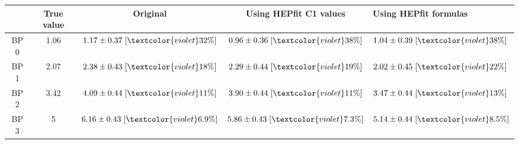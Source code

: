 \begin{tabular}{c||c|c|c}
 & True value & Original & Using HEPfit C1 values & Using HEPfit formulas\\
\hline\hline
BP 0 & 1.06 & $1.17\pm0.37\;[\textcolor{violet}{32\%}]$ & $0.96\pm0.36\;[\textcolor{violet}{38\%}]$ & $1.04\pm0.39\;[\textcolor{violet}{38\%}]$\\\hline
BP 1 & 2.07 & $2.38\pm0.43\;[\textcolor{violet}{18\%}]$ & $2.29\pm0.44\;[\textcolor{violet}{19\%}]$ & $2.02\pm0.45\;[\textcolor{violet}{22\%}]$\\\hline
BP 2 & 3.42 & $4.09\pm0.44\;[\textcolor{violet}{11\%}]$ & $3.90\pm0.44\;[\textcolor{violet}{11\%}]$ & $3.47\pm0.44\;[\textcolor{violet}{13\%}]$\\\hline
BP 3 & 5 & $6.16\pm0.43\;[\textcolor{violet}{6.9\%}]$ & $5.86\pm0.43\;[\textcolor{violet}{7.3\%}]$ & $5.14\pm0.44\;[\textcolor{violet}{8.5\%}]$\\
\end{tabular}
